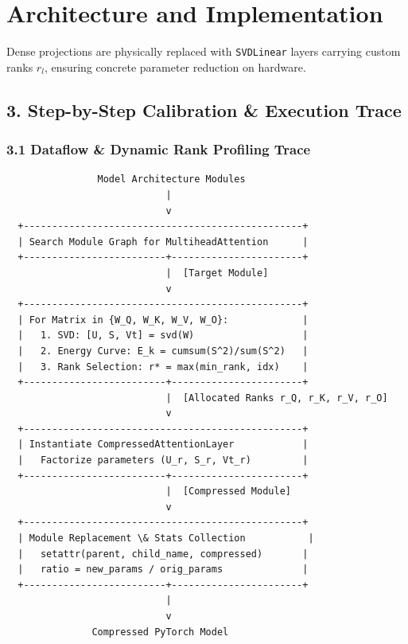 \section{Architecture and Implementation}
Dense projections are physically replaced with \texttt{SVDLinear} layers carrying custom ranks $r_l$, ensuring concrete parameter reduction on hardware.



\subsection{3. Step-by-Step Calibration \& Execution Trace}
\subsubsection{3.1 Dataflow \& Dynamic Rank Profiling Trace}


\begin{lstlisting}
                Model Architecture Modules
                            |
                            v
  +-------------------------------------------------+
  | Search Module Graph for MultiheadAttention      |
  +-------------------------+-----------------------+
                            |  [Target Module]
                            v
  +-------------------------------------------------+
  | For Matrix in {W_Q, W_K, W_V, W_O}:             |
  |   1. SVD: [U, S, Vt] = svd(W)                   |
  |   2. Energy Curve: E_k = cumsum(S^2)/sum(S^2)   |
  |   3. Rank Selection: r* = max(min_rank, idx)    |
  +-------------------------+-----------------------+
                            |  [Allocated Ranks r_Q, r_K, r_V, r_O]
                            v
  +-------------------------------------------------+
  | Instantiate CompressedAttentionLayer            |
  |   Factorize parameters (U_r, S_r, Vt_r)         |
  +-------------------------+-----------------------+
                            |  [Compressed Module]
                            v
  +-------------------------------------------------+
  | Module Replacement \& Stats Collection           |
  |   setattr(parent, child_name, compressed)       |
  |   ratio = new_params / orig_params              |
  +-------------------------+-----------------------+
                            |
                            v
               Compressed PyTorch Model
\end{lstlisting}


